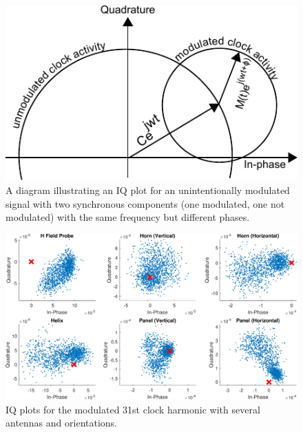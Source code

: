 \begin{figure}[hbt]
\includegraphics[width=5in]{multiple_clock_components}
\caption{A diagram illustrating an IQ plot for an unintentionally modulated signal with two synchronous components (one modulated, one not modulated) with the same frequency but different phases.}
\label{multiple_clock_components}
\end{figure}

\begin{figure}
\includegraphics[width=\textwidth]{all_iq_h31}
\caption{IQ plots for the modulated 31st clock harmonic with several antennas and orientations.}
\label{all_iq_h31}
\end{figure}


